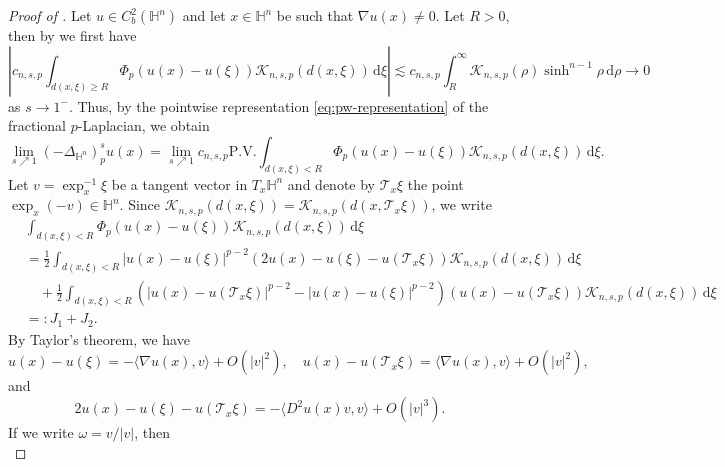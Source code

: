 \documentclass[11pt]{amsart}
\theoremstyle{plain}
\theoremstyle{definition}
\numberwithin{equation}{section}
\begin{document}
\begin{proof} [Proof of ]
Let $u \in C^{2}_{b}(\mathbb{H}^{n})$ and let $x \in \mathbb{H}^{n}$ be such that $\nabla u(x) \neq 0$. Let $R > 0$, then by  we first have
\begin{equation*}
\left| c_{n,s,p} \int_{d(x,\xi) \geq R} \Phi_{p}(u(x)-u(\xi)) \mathcal{K}_{n,s,p}(d(x,\xi)) \,\mathrm{d} \xi \right| \lesssim c_{n,s,p} \int_{R}^{\infty} \mathcal{K}_{n,s,p}(\rho) \sinh^{n-1}\rho \,\mathrm{d}\rho \to 0
\end{equation*}
as $s \to 1^{-}$. Thus, by the pointwise representation \eqref{eq:pw-representation} of the fractional $p$-Laplacian, we obtain
\begin{equation} \label{eq:limit-1}
\lim_{s \nearrow 1} (-\Delta_{\mathbb{H}^{n}})^{s}_{p} u(x) = \lim_{s \nearrow 1} c_{n,s,p} \mathrm{P.V.} \int_{d(x, \xi)<R} \Phi_{p}(u(x)-u(\xi)) \mathcal{K}_{n,s,p}(d(x, \xi)) \,\mathrm{d}\xi.
\end{equation}
Let $v = \exp_{x}^{-1}\xi$ be a tangent vector in $T_{x}\mathbb{H}^{n}$ and denote by $\mathcal{T}_{x}\xi$ the point $\exp_{x}(-v) \in \mathbb{H}^{n}$. Since $\mathcal{K}_{n,s,p}(d(x,\xi)) = \mathcal{K}_{n,s,p}(d(x,\mathcal{T}_{x}\xi))$, we write
\begin{equation*}
\begin{split}
&\int_{d(x, \xi)<R} \Phi_{p}(u(x)-u(\xi)) \mathcal{K}_{n,s,p}(d(x, \xi)) \,\mathrm{d}\xi \\
&= \frac{1}{2} \int_{d(x, \xi)<R} |u(x)-u(\xi)|^{p-2}(2u(x)-u(\xi)-u(\mathcal{T}_{x}\xi)) \mathcal{K}_{n,s,p}(d(x,\xi)) \,\mathrm{d}\xi \\
&\quad + \frac{1}{2} \int_{d(x, \xi) < R} \left( |u(x)-u(\mathcal{T}_{x}\xi)|^{p-2} - |u(x)-u(\xi)|^{p-2} \right)(u(x)-u(\mathcal{T}_{x}\xi)) \mathcal{K}_{n,s,p}(d(x,\xi)) \,\mathrm{d}\xi \\
&=: J_{1} + J_{2}.
\end{split}
\end{equation*}
By Taylor's theorem, we have
\begin{equation*}
u(x)-u(\xi) = -\langle \nabla u(x), v \rangle + O(|v|^{2}), \quad u(x)-u(\mathcal{T}_{x}\xi) = \langle \nabla u(x), v\rangle + O(|v|^{2}),
\end{equation*}
and
\begin{equation*}
2u(x)-u(\xi)-u(\mathcal{T}_{x}\xi) = -\langle D^{2}u(x) v, v\rangle + O(|v|^{3}).
\end{equation*}
If we write $\omega = v/|v|$, then
\begin{equation*}

\end{equation*}
\end{proof}
\end{document}
